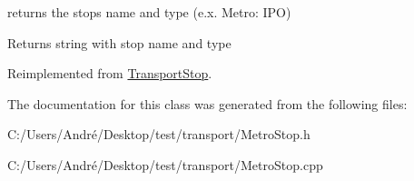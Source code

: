 returns the stop\textquotesingle{}s name and type (e.\+x. Metro\+: I\+P\+O) 

\begin{DoxyReturn}{Returns}
string with stop name and type 
\end{DoxyReturn}


Reimplemented from \hyperlink{class_transport_stop_a245cff19d0ef473d56b93036042478ef}{Transport\+Stop}.



The documentation for this class was generated from the following files\+:\begin{DoxyCompactItemize}
\item 
C\+:/\+Users/\+André/\+Desktop/test/transport/Metro\+Stop.\+h\item 
C\+:/\+Users/\+André/\+Desktop/test/transport/Metro\+Stop.\+cpp\end{DoxyCompactItemize}
